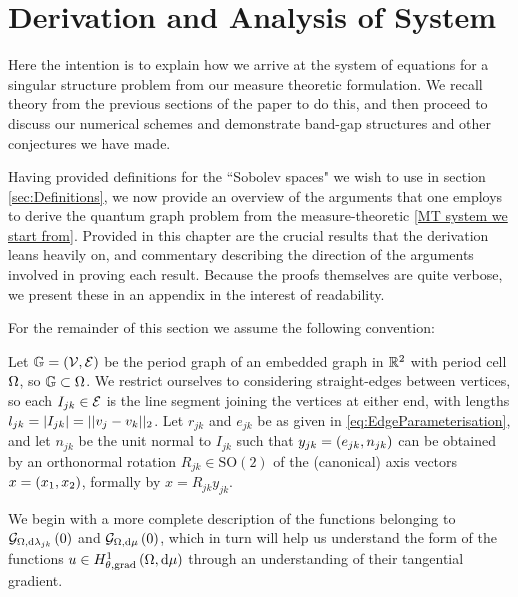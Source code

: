 \section{Derivation and Analysis of System} \label{sec:SystemAndAnalysis}

Here the intention is to explain how we arrive at the system of equations for a singular structure problem from our measure theoretic formulation.
We recall theory from the previous sections of the paper to do this, and then proceed to discuss our numerical schemes and demonstrate band-gap structures and other conjectures we have made. \newline

Having provided definitions for the ``Sobolev spaces" we wish to use in section \ref{sec:Definitions}, we now provide an overview of the arguments that one employs to derive the quantum graph problem  from the measure-theoretic \ref{MT system we start from}.
Provided in this chapter are the crucial results that the derivation leans heavily on, and commentary describing the direction of the arguments involved in proving each result.
Because the proofs themselves are quite verbose, we present these in an appendix  in the interest of readability. \newline

For the remainder of this section we assume the following convention:
\begin{convention} \label{conv:MeasTheoryProblemSetup}
	Let $\mathbb{G}=\left( \mathcal{V},\mathcal{E} \right)$ be the period graph of an embedded graph in $\mathbb{R}^2$ with period cell $\Omega$, so $\mathbb{G}\subset\Omega$.
	We restrict ourselves to considering straight-edges between vertices, so each $I_{jk}\in \mathcal{E}$ is the line segment joining the vertices at either end, with lengths $l_{jk} = \left\lvert I_{jk} \right\rvert = \lvert\lvert v_j-v_k \rvert\rvert_2$.
	Let $r_{jk}$ and $e_{jk}$ be as given in \eqref{eq:EdgeParameterisation}, and let $n_{jk}$ be the unit normal to $I_{jk}$ such that $y_{jk} = \left( e_{jk}, n_{jk} \right)$ can be obtained by an orthonormal rotation $R_{jk}\in\mathrm{SO}(2)$ of the (canonical) axis vectors $x = \left( x_1, x_2 \right)$, formally by $x = R_{jk}y_{jk}$.
\end{convention}
We begin with a more complete description of the functions belonging to $\mathcal{G}_{ \Omega, \mathrm{d}\lambda_{jk}}\left( 0 \right)$ and $\mathcal{G}_{ \Omega, \mathrm{d}\mu}\left( 0 \right)$, which in turn will help us understand the form of the functions $u\in H^1_{\theta, \mathrm{grad}}\left( \Omega, \mathrm{d}\mu \right)$ through an understanding of their tangential gradient.

